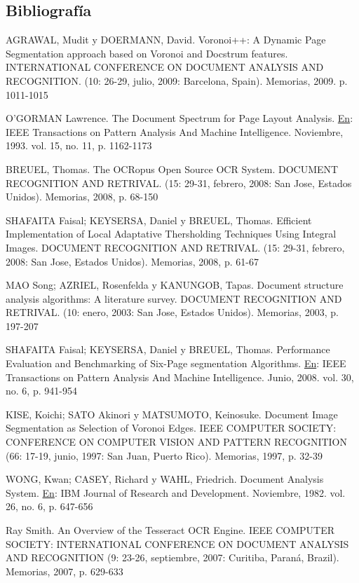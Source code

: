 \documentclass[a4paper, 11pt, oneside]{article}
\begin{document}
	\begin{center}
	\section{Bibliografía}
	\end{center}
	AGRAWAL, Mudit y DOERMANN, David. Voronoi++: A Dynamic Page Segmentation approach based on Voronoi and Docstrum features. INTERNATIONAL CONFERENCE ON DOCUMENT ANALYSIS AND RECOGNITION. (10: 26-29, julio, 2009: Barcelona, Spain). Memorias, 2009. p. 1011-1015
	
	O'GORMAN Lawrence. The Document Spectrum for Page Layout Analysis. \underline{En}: IEEE Transactions on Pattern Analysis And Machine Intelligence. Noviembre, 1993. vol. 15, no. 11, p. 1162-1173
	
	BREUEL, Thomas. The OCRopus Open Source OCR System. DOCUMENT RECOGNITION AND RETRIVAL. (15: 29-31, febrero, 2008: San Jose, Estados Unidos). Memorias, 2008, p. 68-150
	
	SHAFAITA Faisal; KEYSERSA, Daniel y BREUEL, Thomas. Efficient Implementation of Local Adaptative Thersholding Techniques Using Integral Images. DOCUMENT RECOGNITION AND RETRIVAL. (15: 29-31, febrero, 2008: San Jose, Estados Unidos). Memorias, 2008, p. 61-67
	
	MAO Song; AZRIEL, Rosenfelda y KANUNGOB, Tapas. Document structure analysis algorithms: A literature survey. DOCUMENT RECOGNITION AND RETRIVAL. (10: enero, 2003: San Jose, Estados Unidos). Memorias, 2003, p. 197-207
	
	SHAFAITA Faisal; KEYSERSA, Daniel y BREUEL, Thomas. Performance Evaluation and Benchmarking of Six-Page segmentation Algorithms. \underline{En}: IEEE Transactions on Pattern Analysis And Machine Intelligence. Junio, 2008. vol. 30, no. 6, p. 941-954
	
	KISE, Koichi; SATO Akinori y MATSUMOTO, Keinosuke. Document Image Segmentation as Selection of Voronoi Edges. IEEE COMPUTER SOCIETY: CONFERENCE ON COMPUTER VISION AND PATTERN RECOGNITION (66: 17-19, junio, 1997: San Juan, Puerto Rico). Memorias, 1997, p. 32-39
	
	WONG, Kwan; CASEY, Richard y WAHL, Friedrich. Document Analysis System. \underline{En}: IBM Journal of Research and Development. Noviembre, 1982. vol. 26, no. 6, p. 647-656
	
	Ray Smith. An Overview of the Tesseract OCR Engine. IEEE COMPUTER SOCIETY: INTERNATIONAL CONFERENCE ON DOCUMENT ANALYSIS AND RECOGNITION (9: 23-26, septiembre, 2007: Curitiba, Paraná, Brazil). Memorias, 2007, p. 629-633
	
\end{document}
